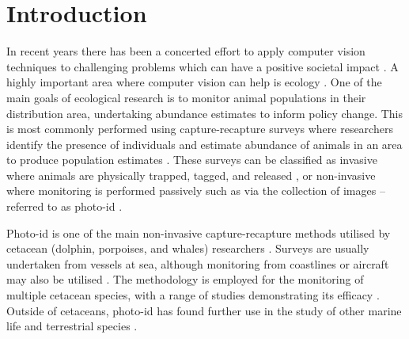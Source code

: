 \chapter{Introduction}\label{ch:intro}


In recent years there has been a concerted effort to apply computer vision techniques to challenging problems which can have a positive societal impact \cite{zhang_unsupervised_2022, jackson_phenotypic_2019, stankiewicz_segmentation_2021, ghosh_facilitating_2022, robin_learning_2022, nasir_dwelling_2022}. A highly important area where computer vision can help is ecology \cite{weinstein_computer_2018}. One of the main goals of ecological research is to monitor animal populations in their distribution area, undertaking abundance estimates to inform policy change. This is most commonly performed using capture-recapture surveys where researchers identify the presence of individuals and estimate abundance of animals in an area to produce population estimates \cite{constantine_abundance_2012, bigg_assessment_1982, sharpe_indian_2019, van_bressem_visual_2018, arso_civil_changing_2019, cheney_long-term_2014}. These surveys can be classified as invasive where animals are physically trapped, tagged, and released \cite{norris_tagging_1970, hobbs_bowhead_1982, andrews_best_2019}, or non-invasive where monitoring is performed passively such as via the collection of images -- referred to as photo-id \cite{vanbressem_visual_2018, urian_recommendations_2015, reisser_photographic_2008, langtimm_survival_2004, holmberg_estimating_2009}.

Photo-id is one of the main non-invasive capture-recapture methods utilised by cetacean (dolphin, porpoises, and whales) researchers \cite{hammond_individual_1990, evans_monitoring_2004}. Surveys are usually undertaken from vessels at sea, although monitoring from coastlines or aircraft may also be utilised \cite{payne_long_1986, forney_seasonal_1998, wursig_methods_1990}. The methodology is employed for the monitoring of multiple cetacean species, with a range of studies demonstrating its efficacy \cite{sharpe_indian_2019, miragliuolo_rissos_2004, feyrer_origin_2021, bigg_assessment_1982}. Outside of cetaceans, photo-id has found further use in the study of other marine life \cite{holmberg_estimating_2009, reisser_photographic_2008} and terrestrial species \cite{goswami_application_2007, clapham_automated_2020}.

